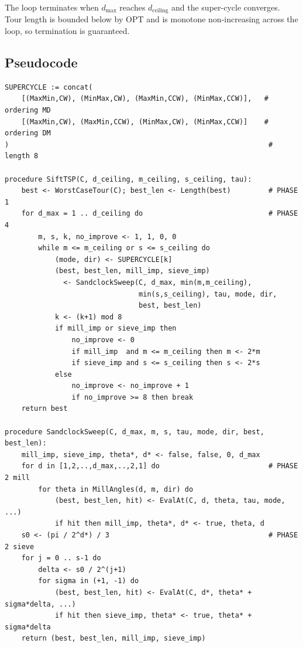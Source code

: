 \documentclass[11pt,a4paper]{article}
\begin{document}
The loop terminates when $d_{\max}$ reaches $d_{\text{ceiling}}$ and the
super-cycle converges. Tour length is bounded below by OPT and is
monotone non-increasing across the loop, so termination is guaranteed.

\subsection{Pseudocode}

\begin{small}
\begin{verbatim}
SUPERCYCLE := concat(
    [(MaxMin,CW), (MinMax,CW), (MaxMin,CCW), (MinMax,CCW)],   # ordering MD
    [(MaxMin,CW), (MaxMin,CCW), (MinMax,CW), (MinMax,CCW)]    # ordering DM
)                                                              # length 8

procedure SiftTSP(C, d_ceiling, m_ceiling, s_ceiling, tau):
    best <- WorstCaseTour(C); best_len <- Length(best)         # PHASE 1
    for d_max = 1 .. d_ceiling do                              # PHASE 4
        m, s, k, no_improve <- 1, 1, 0, 0
        while m <= m_ceiling or s <= s_ceiling do
            (mode, dir) <- SUPERCYCLE[k]
            (best, best_len, mill_imp, sieve_imp)
              <- SandclockSweep(C, d_max, min(m,m_ceiling),
                                min(s,s_ceiling), tau, mode, dir,
                                best, best_len)
            k <- (k+1) mod 8
            if mill_imp or sieve_imp then
                no_improve <- 0
                if mill_imp  and m <= m_ceiling then m <- 2*m
                if sieve_imp and s <= s_ceiling then s <- 2*s
            else
                no_improve <- no_improve + 1
                if no_improve >= 8 then break
    return best

procedure SandclockSweep(C, d_max, m, s, tau, mode, dir, best, best_len):
    mill_imp, sieve_imp, theta*, d* <- false, false, 0, d_max
    for d in [1,2,..,d_max,..,2,1] do                          # PHASE 2 mill
        for theta in MillAngles(d, m, dir) do
            (best, best_len, hit) <- EvalAt(C, d, theta, tau, mode, ...)
            if hit then mill_imp, theta*, d* <- true, theta, d
    s0 <- (pi / 2^d*) / 3                                      # PHASE 2 sieve
    for j = 0 .. s-1 do
        delta <- s0 / 2^(j+1)
        for sigma in (+1, -1) do
            (best, best_len, hit) <- EvalAt(C, d*, theta* + sigma*delta, ...)
            if hit then sieve_imp, theta* <- true, theta* + sigma*delta
    return (best, best_len, mill_imp, sieve_imp)


\end{verbatim}
\end{small}
\end{document}
